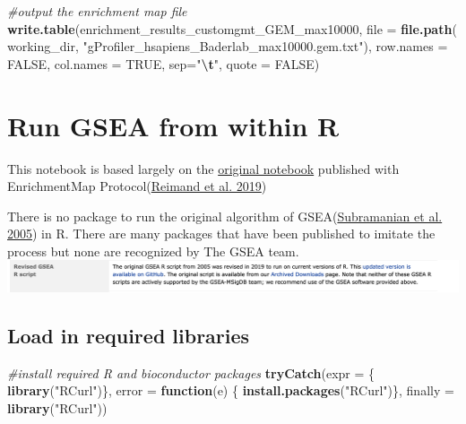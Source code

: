 \documentclass[
]{book}
\newenvironment{Shaded}{\begin{snugshade}}{\end{snugshade}}
\newcommand{\AttributeTok}[1]{\textcolor[rgb]{0.13,0.29,0.53}{#1}}
\newcommand{\CommentTok}[1]{\textcolor[rgb]{0.56,0.35,0.01}{\textit{#1}}}
\newcommand{\ConstantTok}[1]{\textcolor[rgb]{0.56,0.35,0.01}{#1}}
\newcommand{\ControlFlowTok}[1]{\textcolor[rgb]{0.13,0.29,0.53}{\textbf{#1}}}
\newcommand{\FunctionTok}[1]{\textcolor[rgb]{0.13,0.29,0.53}{\textbf{#1}}}
\newcommand{\NormalTok}[1]{#1}
\newcommand{\SpecialCharTok}[1]{\textcolor[rgb]{0.81,0.36,0.00}{\textbf{#1}}}
\newcommand{\StringTok}[1]{\textcolor[rgb]{0.31,0.60,0.02}{#1}}
\begin{document}
\begin{Shaded}
\begin{Highlighting}[]
\CommentTok{\#output the enrichment map file}
\FunctionTok{write.table}\NormalTok{(enrichment\_results\_customgmt\_GEM\_max10000, }
                  \AttributeTok{file =} \FunctionTok{file.path}\NormalTok{(}
\NormalTok{                    working\_dir, }\StringTok{"gProfiler\_hsapiens\_Baderlab\_max10000.gem.txt"}\NormalTok{),}
                  \AttributeTok{row.names =} \ConstantTok{FALSE}\NormalTok{, }
                  \AttributeTok{col.names =} \ConstantTok{TRUE}\NormalTok{, }\AttributeTok{sep=}\StringTok{"}\SpecialCharTok{\textbackslash{}t}\StringTok{"}\NormalTok{,}
                  \AttributeTok{quote =} \ConstantTok{FALSE}\NormalTok{)}
\end{Highlighting}
\end{Shaded}

\hypertarget{run-gsea-from-within-r}{%
\chapter{Run GSEA from within R}\label{run-gsea-from-within-r}}

This notebook is based largely on the \href{https://baderlab.github.io/Cytoscape_workflows/EnrichmentMapPipeline/Protocol2_createEM.html}{original notebook} published with EnrichmentMap Protocol(\protect\hyperlink{ref-em2019}{Reimand et al. 2019})

There is no package to run the original algorithm of GSEA(\protect\hyperlink{ref-gsea2005}{Subramanian et al. 2005}) in R. There are many packages that have been published to imitate the process but none are recognized by The GSEA team.\\
\includegraphics{./images/gsea_r_package_message.png}

\hypertarget{load-in-required-libraries}{%
\section{Load in required libraries}\label{load-in-required-libraries}}

\begin{Shaded}
\begin{Highlighting}[]
\CommentTok{\#install required R and bioconductor packages}
\FunctionTok{tryCatch}\NormalTok{(}\AttributeTok{expr =}\NormalTok{ \{ }\FunctionTok{library}\NormalTok{(}\StringTok{"RCurl"}\NormalTok{)\}, }
         \AttributeTok{error =} \ControlFlowTok{function}\NormalTok{(e) \{  }
           \FunctionTok{install.packages}\NormalTok{(}\StringTok{"RCurl"}\NormalTok{)\}, }
         \AttributeTok{finally =} \FunctionTok{library}\NormalTok{(}\StringTok{"RCurl"}\NormalTok{))}
\end{Highlighting}
\end{Shaded}
\end{document}
